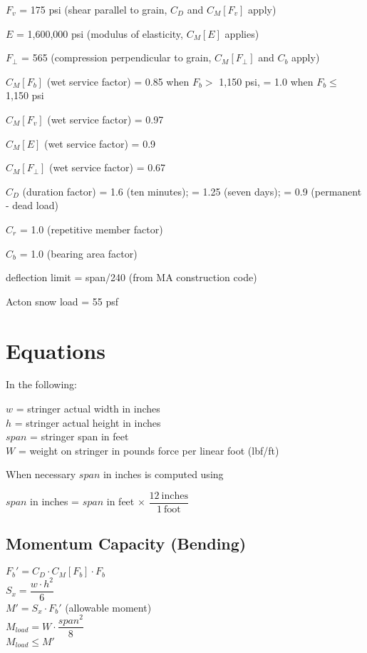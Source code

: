 \documentclass[12pt]{article}
\newenvironment{indpar}[1][0.3in]%
	{\begin{list}{}%
		     {\setlength{\itemsep}{0in}%
		      \setlength{\topsep}{0in}%
		      \setlength{\parsep}{1ex}%
		      \setlength{\labelwidth}{#1}%
		      \setlength{\leftmargin}{#1}%
		      \addtolength{\leftmargin}{\labelsep}}%
	 \item}%
	{\end{list}}
\begin{document}
$F_v$ = 175 psi (shear parallel to grain, $C_D$ and $C_M[F_v]$ apply)

$E$ = 1,600,000 psi (modulus of elasticity, $C_M[E]$ applies)

$F_\perp$ = 565 (compression perpendicular to grain, $C_M[F_\perp]$ and $C_b$
                 apply)

$C_M[F_b]$ (wet service factor)
    = 0.85 when $F_b >$ 1,150 psi, = 1.0 when $F_b \leq$ 1,150 psi

$C_M[F_v]$ (wet service factor) = 0.97

$C_M[E]$ (wet service factor) = 0.9

$C_M[F_\perp]$ (wet service factor) = 0.67

$C_D$ (duration factor) = 1.6 (ten minutes); = 1.25 (seven days);
                        = 0.9 (permanent - dead load)

$C_r$ = 1.0 (repetitive member factor)

$C_b$ = 1.0 (bearing area factor)

deflection limit = span/240 (from MA construction code)

Acton snow load = 55 psf

\newpage
\section{Equations}

In the following:

\begin{indpar}
$w$ = stringer actual width in inches \\
$h$ = stringer actual height in inches \\
$span$ = stringer span in feet \\
$W$ = weight on stringer in pounds force per linear foot (lbf/ft)
\end{indpar}
When necessary $span$ in inches is computed using
\begin{indpar}
$span$ in inches  = $span$ in feet $\times$
                    $\dfrac{12~\mathrm{inches}}{1~\mathrm{foot}}$
\end{indpar}

\subsection{Momentum Capacity (Bending)}

$F_b' = C_D \cdot C_M[F_b] \cdot F_b$
\\[1.0ex]
$S_x = \dfrac{w\cdot h^2}{6}$
\\[1.0ex]
$M' = S_x \cdot F_b'$ (allowable moment)
\\[1.0ex]
$M_{load} = W \cdot \dfrac{span^2}{8}$
\\[1.0ex]
$M_{load} \leq M'$
\end{document}
